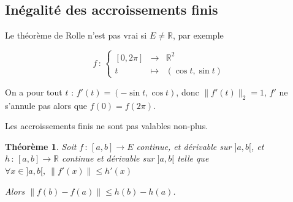 \documentclass[]{article}
\newtheorem{mythm}{Théorème}
\theoremstyle{remark}
\theoremstyle{definition}
\newcommand{\func}[5]{
#1 \, : \, \left\{ \begin{array}{lcl}
	#2 & \longrightarrow & #3 \\
	#4 & \longmapsto & #5
\end{array}
\right.
}
\newcommand{\funcshort}[3]{
#1 \, : \, #2 \longrightarrow #3
}
\begin{document}
\subsection{Inégalité des accroissements finis}

Le théorème de Rolle n'est pas vrai si $E \neq \mathbb{R}$, par exemple

$$\func{f}{[0, 2\pi]}{\mathbb{R}^2}{t}{(\cos t, \sin t)}$$

On a pour tout $t$ : $f'(t)=(-\sin t, \cos t)$, donc $\|f'(t)\|_2 = 1$, $f'$ ne s'annule pas alors que $f(0)=f(2\pi)$.

Les accroissements finis ne sont pas valables non-plus.

\begin{mythm}
	Soit $\funcshort{f}{[a, b]}{E}$ continue, et dérivable sur $]a,b[$, et $\funcshort{h}{[a, b]}{\mathbb{R}}$ continue et dérivable sur $]a, b[$ telle que $\forall x \in ]a,b[, ~ \|f'(x)\| \leqslant h'(x)$
	
	Alors $\|f(b) - f(a)\| \leqslant h(b) - h(a)$.
\end{mythm}
\end{document}
